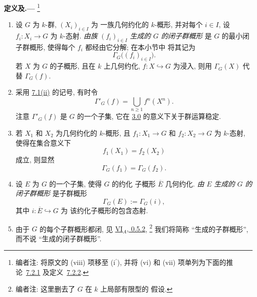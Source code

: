 \par
\ifdim\dimexpr\pagegoal-\pagetotal\relax<12\baselineskip
  \newpage
\fi
\medskip
{}\label{defrem:sga3-VIB-7.2}%
\noindent\textbf{定义及.---}%
\footnote{\label{note:sga3-VIB-71}编者注: 将原文的
\textup{(viii)} 项移至
\textup{(i\(^{\prime}\))}, 并将 \textup{(vi)} 和
\textup{(vii)} 项单列为下面的推论~\hyperref[cor:sga3-VIB-7.2.1]{7.2.1}
及定义~\hyperref[def:sga3-VIB-7.2.2]{7.2.2}.}
\begin{enumerate}
\item[\textup{(i)}]\label{def:sga3-VIB-7.2-i}
  设 \(G\) 为 \(k\)-群, \((X_i)_{i\in I}\) 为
  一族几何约化的 \(k\)-概形, 并对每个
  \(i\in I\), 设 \(f_i:X_i\to G\) 为 \(k\)-态射.
  \emph{由族 \((f_i)_{i\in I}\) 生成的 \(G\) 的闭子群概形}
  是 \(G\) 的最小闭子群概形,
  使得每个 \(f_i\) 都经由它分解; 在本小节中
  将其记为
  \[
    \Gamma_G\bigl((f_i)_{i\in I}\bigr).
  \]
  若 \(X\) 为 \(G\) 的子概形, 且在
  \(k\) 上几何约化, \(f:X\hookrightarrow G\) 为浸入, 则用
  \(\Gamma_G(X)\) 代替 \(\Gamma_G(f)\).

\item[\textup{(i\(^{\prime}\))}]
  \label{def:sga3-VIB-7.2-iprime}
  采用 \hyperref[concl:sga3-VIB-7.1-ii]{7.1\textup{(ii)}} 的记号,
  有时令
  \label{form:sga3-VIB-7.2-iprime-Gamma}%
  \[
    \Gamma'_G(f)=\bigcup_{n\geq1}f^n(X^n).
  \]
  注意 \(\Gamma'_G(f)\) 是 \(G\) 的一个子集,
  它在 \hyperref[par:sga3-VIB-3.0]{3.0} 的意义下关于群运算稳定.

\item[\textup{(ii)}]\label{rem:sga3-VIB-7.2-ii}
  若 \(X_1\) 和 \(X_2\) 为几何约化的
  \(k\)-概形, 且 \(f_1:X_1\to G\) 和 \(f_2:X_2\to G\) 为
  \(k\)-态射, 使得在集合意义下
  \[
    f_1(X_1)=f_2(X_2)
  \]
  成立, 则显然
  \[
    \Gamma_G(f_1)=\Gamma_G(f_2).
  \]

\item[\textup{(iii)}]\label{def:sga3-VIB-7.2-iii}
  设 \(E\) 为 \(G\) 的一个子集, 使得 \(G\) 的约化
  子概形 \(\overline E\) 几何约化.
  \emph{由 \(E\) 生成的 \(G\) 的闭子群概形}
  是子群概形
  \[
    \Gamma_G(E):=\Gamma_G(i),
  \]
  其中 \(i:\overline E\hookrightarrow G\) 为
  该约化子概形的包含态射.

\item[\textup{(iv)}]\label{rem:sga3-VIB-7.2-iv}
  由于 \(G\) 的每个子群概形都闭, 见
  \hyperref[sga3:VIA:0.5.2]{VI\(_A\), 0.5.2},%
  \footnote{\label{note:sga3-VIB-72}编者注: 这里删去了
  \(G\) 在 \(k\) 上局部有限型的
  假设.}
  我们将简称 ``生成的子群概形'',
  而不说 ``生成的闭子群概形''.


\end{enumerate}
